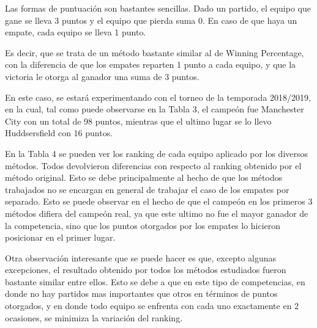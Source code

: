 \documentclass[a4paper]{article}
\begin{document}
Las formas de puntuación son bastantes sencillas. Dado un partido, el equipo que gane se lleva 3 puntos y el equipo que pierda suma 0. En caso de que haya un empate, cada equipo se lleva 1 punto.

Es decir, que se trata de un método bastante similar al de Winning Percentage, con la diferencia de que los empates reparten 1 punto a cada equipo, y que la victoria le otorga al ganador una suma de 3 puntos.

En este caso, se estará experimentando con el torneo de la temporada 2018/2019, en la cual, tal como puede observarse en la Tabla 3, el campeón fue Manchester City con un total de 98 puntos, mientras que el ultimo lugar se lo llevo Huddsersfield con 16 puntos.

En la Tabla 4 se pueden ver los ranking de cada equipo aplicado por los diversos métodos. Todos devolvieron diferencias con respecto al ranking obtenido por el método original. Esto se debe principalmente al hecho de que los métodos trabajados no se encargan en general de trabajar el caso de los empates por separado. Esto se puede observar en el hecho de que el campeón en los primeros 3 métodos difiera del campeón real, ya que este ultimo no fue el mayor ganador de la competencia, sino que los puntos otorgados por los empates lo hicieron posicionar en el primer lugar.

Otra observación interesante que se puede hacer es que, excepto algunas excepciones, el resultado obtenido por todos los métodos estudiados fueron bastante similar entre ellos. Esto se debe a que en este tipo de competencias, en donde no hay partidos mas importantes que otros en términos de puntos otorgados, y en donde todo equipo se enfrenta con cada uno exactamente en 2 ocasiones, se minimiza la variación del ranking.

\newpage
\end{document}
